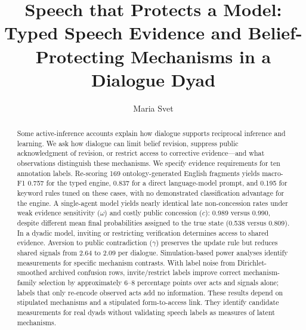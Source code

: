 \documentclass[runningheads]{llncs}
\begin{document}
\title{Speech that Protects a Model: Typed Speech Evidence and Belief-Protecting Mechanisms in a Dialogue Dyad}
\author{Maria Svet}

\maketitle

\begin{abstract}
Some active-inference accounts explain how dialogue supports reciprocal inference and learning. We ask how dialogue can limit belief revision, suppress public acknowledgment of revision, or restrict access to corrective evidence---and what observations distinguish these mechanisms. We specify evidence requirements for ten annotation labels. Re-scoring 169 ontology-generated English fragments yields macro-F1 0.757 for the typed engine, 0.837 for a direct language-model prompt, and 0.195 for keyword rules tuned on these cases, with no demonstrated classification advantage for the engine. A single-agent model yields nearly identical late non-concession rates under weak evidence sensitivity ($\omega$) and costly public concession ($c$): 0.989 versus 0.990, despite different mean final probabilities assigned to the true state (0.538 versus 0.809). In a dyadic model, inviting or restricting verification determines access to shared evidence. Aversion to public contradiction ($\gamma$) preserves the update rule but reduces shared signals from 2.64 to 2.09 per dialogue. Simulation-based power analyses identify measurements for specific mechanism contrasts. With label noise from Dirichlet-smoothed archived confusion rows, invite/restrict labels improve correct mechanism-family selection by approximately 6--8 percentage points over acts and signals alone; labels that only re-encode observed acts add no information. These results depend on stipulated mechanisms and a stipulated form-to-access link. They identify candidate measurements for real dyads without validating speech labels as measures of latent mechanisms.
\end{abstract}
\end{document}
